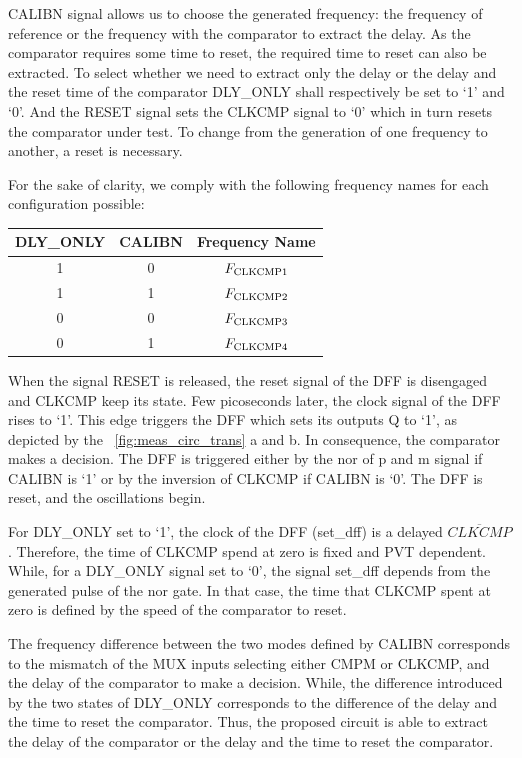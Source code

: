 CALIBN signal allows us to choose the generated frequency: the frequency of reference or the frequency with the comparator to extract the delay. As the comparator requires some time to reset, the required time to reset can also be extracted. To select whether we need to extract only the delay or the delay and the reset time of the comparator DLY\_ONLY shall respectively be set to `1' and `0'. And the RESET signal sets the CLKCMP signal to `0' which in turn resets the comparator under test. To change from the generation of one frequency to another, a reset is necessary.

For the sake of clarity, we comply with the following frequency names for each configuration possible:
\begin{table}[htp]
    \centering
    \begin{tabular}{@{}ccc@{}}
    \toprule
    DLY\_ONLY & CALIBN & Frequency Name \\ \midrule
    1 & 0 & $F_{\rm CLKCMP1}$ \\
    1 & 1 & $F_{\rm CLKCMP2}$ \\
    0 & 0 & $F_{\rm CLKCMP3}$ \\
    0 & 1 & $F_{\rm CLKCMP4}$ \\ \bottomrule
    \end{tabular}
\end{table}

When the signal RESET is released, the reset signal of the DFF is disengaged and CLKCMP keep its state. Few picoseconds later, the clock signal of the DFF rises to `1'. This edge triggers the DFF which sets its outputs Q to `1', as depicted by the \figurename~\ref{fig:meas_circ_trans} a and b. In consequence, the comparator makes a decision. The DFF is triggered either by the nor of p and m signal if CALIBN is `1' or by the inversion of CLKCMP if CALIBN is `0'. The DFF is reset, and the oscillations begin.

For DLY\_ONLY set to `1', the clock of the DFF (set\_dff) is a delayed \(\overline{CLKCMP}\). Therefore, the time of CLKCMP spend at zero is fixed and PVT dependent. While, for a DLY\_ONLY signal set to `0', the signal set\_dff depends from the generated pulse of the nor gate. In that case, the time that CLKCMP spent at zero is defined by the speed of the comparator to reset.

The frequency difference between the two modes defined by CALIBN corresponds to the mismatch of the MUX inputs selecting either CMPM or CLKCMP, and the delay of the comparator to make a decision. While, the difference introduced by the two states of DLY\_ONLY corresponds to the difference of the delay and the time to reset the comparator. Thus, the proposed circuit is able to extract the delay of the comparator or the delay and the time to reset the comparator.

